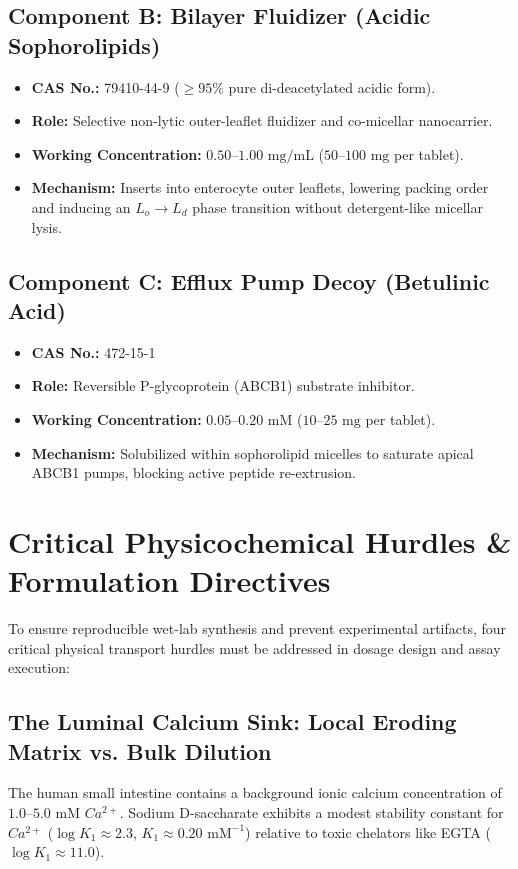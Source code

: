 \documentclass[10pt,twocolumn,letterpaper]{article}
\begin{document}
\subsection{Component B: Bilayer Fluidizer (Acidic Sophorolipids)}
\begin{itemize}[noitemsep]
    \item \textbf{CAS No.:} 79410-44-9 ($\ge 95\%$ pure di-deacetylated acidic form).
    \item \textbf{Role:} Selective non-lytic outer-leaflet fluidizer and co-micellar nanocarrier.
    \item \textbf{Working Concentration:} $0.50\text{--}1.00\text{ mg/mL}$ ($50\text{--}100\text{ mg}$ per tablet).
    \item \textbf{Mechanism:} Inserts into enterocyte outer leaflets, lowering packing order and inducing an $L_o \rightarrow L_d$ phase transition without detergent-like micellar lysis.
\end{itemize}

\subsection{Component C: Efflux Pump Decoy (Betulinic Acid)}
\begin{itemize}[noitemsep]
    \item \textbf{CAS No.:} 472-15-1
    \item \textbf{Role:} Reversible P-glycoprotein (ABCB1) substrate inhibitor.
    \item \textbf{Working Concentration:} $0.05\text{--}0.20\text{ mM}$ ($10\text{--}25\text{ mg}$ per tablet).
    \item \textbf{Mechanism:} Solubilized within sophorolipid micelles to saturate apical ABCB1 pumps, blocking active peptide re-extrusion.
\end{itemize}

\section{Critical Physicochemical Hurdles \& Formulation Directives}

To ensure reproducible wet-lab synthesis and prevent experimental artifacts, four critical physical transport hurdles must be addressed in dosage design and assay execution:

\subsection{The Luminal Calcium Sink: Local Eroding Matrix vs. Bulk Dilution}
The human small intestine contains a background ionic calcium concentration of $1.0\text{--}5.0\text{ mM } Ca^{2+}$. Sodium D-saccharate exhibits a modest stability constant for $Ca^{2+}$ ($\log K_1 \approx 2.3$, $K_1 \approx 0.20\text{ mM}^{-1}$) relative to toxic chelators like EGTA ($\log K_1 \approx 11.0$). 
\end{document}
